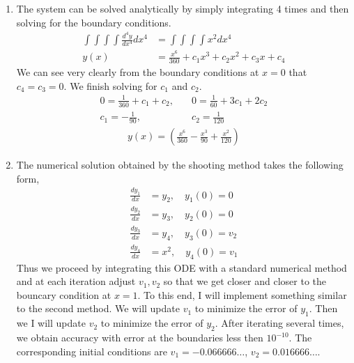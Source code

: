 \documentclass{article}
\begin{document}
\begin{enumerate}[label=\alph*)]

  \item The system can be solved analytically by simply integrating 4 times and
  then solving for the boundary conditions. 
  \begin{align*}
    \int\int\int\int \frac{d^4y}{dx^4} dx^4 &= \int\int\int\int x^2 dx^4\\
    y(x) &= \frac{x^6}{360} + c_1x^3 + c_2x^2 + c_3x + c_4
  \end{align*}
  We can see very clearly from the boundary conditions at $x=0$ that $c_4=c_3=0$.
  We finish solving for $c_1$ and $c_2$.
  \begin{align*}
    0 = \frac{1}{360} + c_1 + c_2, &\quad 0 = \frac{1}{60} + 3c_1 + 2c_2\\
    c_1 = -\frac{1}{90}, &\quad c_2 = \frac{1}{120}
  \end{align*}
  \begin{align*}
    y(x) = \left(\frac{x^6}{360} - \frac{x^3}{90} +
    \frac{x^2}{120}\right)
  \end{align*}

  \item 
  The numerical solution obtained by the shooting method takes the following
  form,
  \begin{align*}
    \frac{dy_1}{dx} &= y_2, \quad y_1(0) = 0\\
    \frac{dy_2}{dx} &= y_3, \quad y_2(0) = 0\\
    \frac{dy_3}{dx} &= y_4, \quad y_3(0) = v_2\\
    \frac{dy_4}{dx} &= x^2, \quad y_4(0) = v_1
  \end{align*}
  Thus we proceed by integrating this ODE with a standard numerical method and
  at each iteration adjust $v_1, v_2$ so that we get closer and closer to the bouncary
  condition at $x=1$. To this end, I will implement something similar to the
  second method. We will update $v_1$ to minimize the error of $y_1$. Then we I
  will update $v_2$ to minimize the error of $y_2$. After iterating several
  times, we obtain accuracy with error at the boundaries less then $10^{-10}$.
  The corresponding initial conditions are $v_1 = -0.066666\ldots$, $v_2 =
  0.016666\ldots$. 


\end{enumerate}
\end{document}
